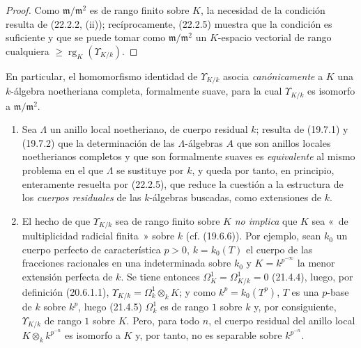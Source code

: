 \begin{proof}
Como $\mathfrak m/\mathfrak m^2$ es de rango finito sobre $K$, la necesidad
de la condición resulta de (22.2.2, (ii)); recíprocamente, (22.2.5) muestra que
la condición es suficiente y que se puede tomar como
$\mathfrak m/\mathfrak m^2$ un $K$-espacio vectorial de rango cualquiera
$\geqslant\operatorname{rg}_K(\Upsilon_{K/k})$.
\end{proof}


En particular, el homomorfismo identidad de $\Upsilon_{K/k}$ asocia
\emph{canónicamente} a $K$ una $k$-álgebra noetheriana completa, formalmente
suave, para la cual $\Upsilon_{K/k}$ es isomorfo a
$\mathfrak m/\mathfrak m^2$.

\begin{remarks}[22.2.7]
\label{0.22.2.7-fr}
\begin{enumerate}
  \item[(i)] Sea $\Lambda$ un anillo local noetheriano, de cuerpo residual
  $k$; resulta de (19.7.1) y (19.7.2) que la determinación de las
  $\Lambda$-álgebras $A$ que son anillos locales noetherianos completos y que
  son formalmente suaves es \emph{equivalente} al mismo problema en el que
  $\Lambda$ se sustituye por $k$, y queda por tanto, en principio, enteramente
  resuelta por (22.2.5), que reduce la cuestión a la estructura de los
  \emph{cuerpos residuales} de las $k$-álgebras buscadas, como extensiones de
  $k$.

  \item[(ii)] El hecho de que $\Upsilon_{K/k}$ sea de rango finito sobre $K$
  \emph{no implica} que $K$ sea «~de multiplicidad radicial finita~» sobre
  $k$ (cf. (19.6.6)). Por ejemplo, sean $k_0$ un cuerpo perfecto de
  característica $p>0$, $k=k_0(T)$ el cuerpo de las fracciones racionales en
  una indeterminada sobre $k_0$ y $K=k^{p^{-\infty}}$ la menor extensión
  perfecta de $k$. Se tiene entonces $\Omega^1_K=\Omega^1_{K/k}=0$ (21.4.4),
  luego, por definición (20.6.1.1),
  $\Upsilon_{K/k}=\Omega^1_k\otimes_kK$; y como $k^p=k_0(T^p)$, $T$ es una
  $p$-base de $k$ sobre $k^p$, luego (21.4.5) $\Omega^1_k$ es de rango $1$
  sobre $k$ y, por consiguiente, $\Upsilon_{K/k}$ de rango $1$ sobre $K$.
  Pero, para todo $n$, el cuerpo residual del anillo local
  $K\otimes_kk^{p^{-n}}$ es isomorfo a $K$ y, por tanto, no es separable sobre
  $k^{p^{-n}}$.
\end{enumerate}
\end{remarks}

